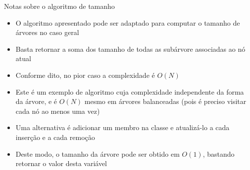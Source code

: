 \begin{frame}[fragile]{Notas sobre o algoritmo de tamanho}

	\begin{itemize}
		\item O algoritmo apresentado pode ser {adaptado} para computar 
		o tamanho de árvores no {caso geral}

		\item Basta retornar a soma dos tamanho de 
		{todas} as subárvore associadas ao nó atual

		\item Conforme dito, no pior caso a complexidade é $O(N)$

		\item Este é um exemplo de algoritmo cuja complexidade independente da forma da árvore,
            e é $O(N)$ mesmo em árvores balanceadas (pois é preciso visitar cada nó ao menos
            uma vez)

        \item Uma alternativa é adicionar um membro  na classe 
            e atualizá-lo a cada inserção e a cada remoção

        \item Deste modo, o tamanho da árvore pode ser obtido em $O(1)$, bastando retornar o valor
            desta variável
	\end{itemize}

\end{frame}

